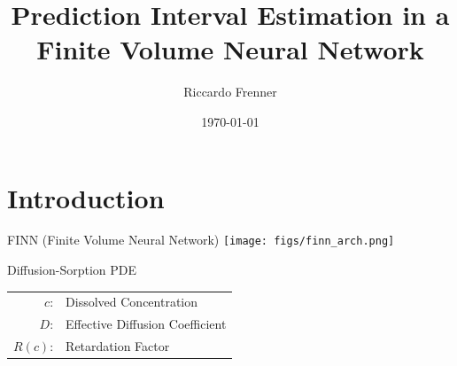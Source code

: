\documentclass[aspectratio=1610]{beamer}
\title{\footnotesize Prediction Interval Estimation in a Finite Volume Neural Network}
\author{Riccardo Frenner}
\date{\today}
\begin{document}
\maketitle




\section{Introduction}



\begin{frame}{FINN (Finite Volume Neural Network)}
\centering
\texttt{[image: figs/finn\_arch.png]}
\end{frame}

\begin{frame}{Diffusion-Sorption PDE}
\centering




\begin{tabular}{rl} 
 $c$: & Dissolved Concentration \\ 
 $D$: & Effective Diffusion Coefficient \\ 
 $R(c)$: & Retardation Factor \\ 
\end{tabular}

\end{frame}
\end{document}
